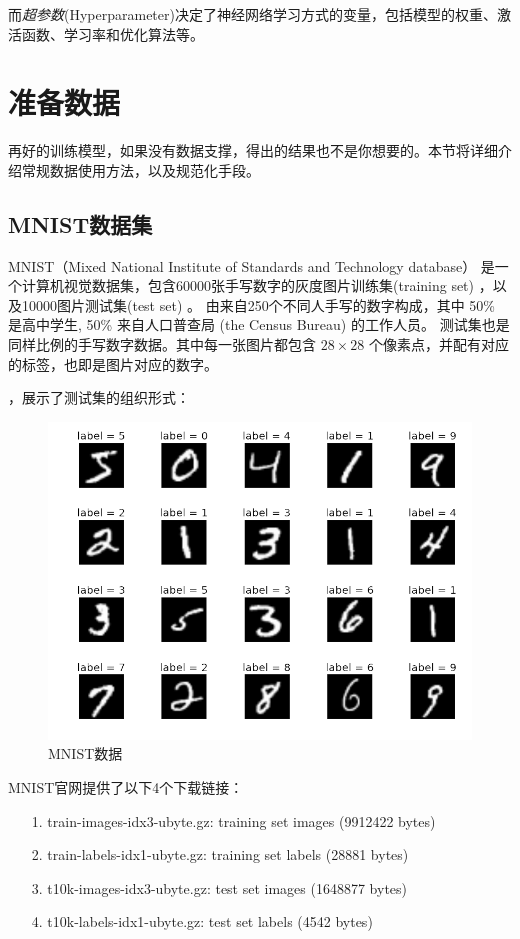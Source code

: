 而\emph{超参数}(Hyperparameter)决定了神经网络学习方式的变量，包括模型的权重、激活函数、学习率和优化算法等。



\section{准备数据}
再好的训练模型，如果没有数据支撑，得出的结果也不是你想要的。本节将详细介绍常规数据使用方法，以及规范化手段。

\subsection{MNIST数据集}
MNIST（Mixed National Institute of Standards and Technology database）
是一个计算机视觉数据集，包含60000张手写数字的灰度图片训练集(training set) ，以及10000图片测试集(test set) 。
由来自250个不同人手写的数字构成，其中 50\% 是高中学生, 50\% 来自人口普查局 (the Census Bureau) 的工作人员。
测试集也是同样比例的手写数字数据。其中每一张图片都包含 $28 \times 28$ 个像素点，并配有对应的标签，也即是图片对应的数字。
\vspace{0.6cm}

\noindent
{}，展示了测试集的组织形式：

\begin{figure}[!htb]
\centerline{\includegraphics[width=.35\figwidth]{images/MNIST-dataset.png}}
\caption{MNIST数据}
\label{fig:part3_mnist_dataset}
\end{figure}

\noindent
MNIST官网提供了以下4个下载链接：
\begin{itemize}
\item[1.] train-images-idx3-ubyte.gz:  training set images (9912422 bytes) 
\item[2.] train-labels-idx1-ubyte.gz:  training set labels (28881 bytes) 
\item[3.] t10k-images-idx3-ubyte.gz:   test set images (1648877 bytes) 
\item[4.] t10k-labels-idx1-ubyte.gz:   test set labels (4542 bytes)
\end{itemize}

